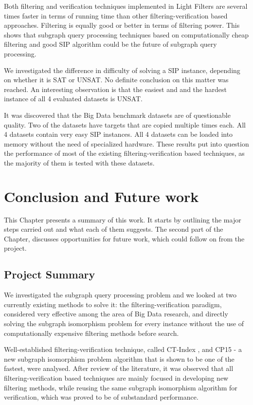 \documentclass{l4proj}
\begin{document}
Both filtering and verification techniques implemented in Light Filters are several times faster in terms of running time than other filtering-verification based approaches. Filtering is equally good or better in terms of filtering power. This shows that subgraph query processing techniques based on computationally cheap filtering and good SIP algorithm could be the future of subgraph query processing. 

We investigated the difference in difficulty of solving a SIP instance, depending on whether it is SAT or UNSAT. No definite conclusion on this matter was reached. An interesting observation is that the easiest and and the hardest instance of all 4 evaluated datasets is UNSAT.

It was discovered that the Big Data benchmark datasets are of questionable quality. Two of the datasets have targets that are copied multiple times each. All 4 datasets contain very easy SIP instances. All 4 datasets can be loaded into memory without the need of specialized hardware. These results put into question the performance of most of the existing filtering-verification based techniques, as the majority of them is tested with these datasets.

\chapter{Conclusion and Future work}
This Chapter presents a summary of this work. It starts by outlining the major steps carried out and what each of them suggests. The second part of the Chapter, discusses opportunities for future work, which could follow on from the project. 

\section{Project Summary}
We investigated the subgraph query processing problem and we looked at two currently existing methods to solve it: the filtering-verification paradigm, considered very effective among the area of Big Data research, and directly solving the subgraph isomorphism problem for every instance without the use of computationally expensive filtering methods before search.

Well-established filtering-verification technique, called CT-Index \cite{ctindex}, and CP15 \cite{CP2015}- a new subgraph isomorphism problem algorithm that is shown to be one of the fastest, were analysed. After review of the literature, it was observed that all filtering-verification based techniques are mainly focused in developing new filtering methods, while reusing the same subgraph isomorphism algorithm for verification, which was proved to be of substandard performance.
\end{document}
